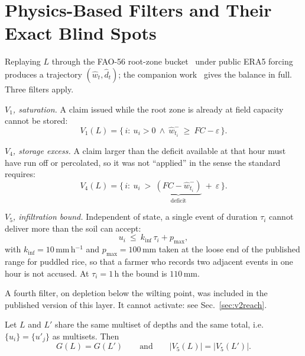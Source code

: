 \section{Physics-Based Filters and Their Exact Blind Spots}
\label{sec:filters}

Replaying $L$ through the FAO-56 root-zone bucket~\cite{fao56} under public ERA5
forcing produces a trajectory $(\hat w_t,\hat d_t)$; the companion
work~\cite{twingate2026} gives the balance in full. Three filters apply.

\emph{$V_1$, saturation.} A claim issued while the root zone is already at field
capacity cannot be stored:
\begin{equation}
V_1(L)=\{\,i:\ u_i>0\ \wedge\ \hat w_{t_i}^{-}\ \ge\ FC-\varepsilon\,\}.
\label{eq:v1}
\end{equation}

\emph{$V_4$, storage excess.} A claim larger than the deficit available at that
hour must have run off or percolated, so it was not ``applied'' in the sense the
standard requires:
\begin{equation}
V_4(L)=\{\,i:\ u_i\ >\ \underbrace{(FC-\hat w_{t_i}^{-})}_{\text{deficit}}
\ +\ \varepsilon\,\}.
\label{eq:v4}
\end{equation}

\emph{$V_5$, infiltration bound.} Independent of state, a single event of
duration $\tau_i$ cannot deliver more than the soil can accept:
\begin{equation}
u_i\ \le\ k_{\mathrm{inf}}\,\tau_i+p_{\max},
\label{eq:v5}
\end{equation}
with $k_{\mathrm{inf}}=10$\,mm\,h$^{-1}$ and $p_{\max}=100$\,mm taken at the
loose end of the published range for puddled rice, so that a farmer who records
two adjacent events in one hour is not accused. At $\tau_i=1$\,h the bound is
$110$\,mm.

A fourth filter, on depletion below the wilting point, was included in the
published version of this layer. It cannot activate: see
Sec.~\ref{sec:v2reach}.

\begin{proposition}
\label{prop:blind}
Let $L$ and $L'$ share the same multiset of depths and the same total, i.e.\
$\{u_i\}=\{u'_j\}$ as multisets. Then
\begin{equation}
G(L)=G(L')\qquad\text{and}\qquad |V_5(L)|=|V_5(L')|.
\end{equation}
\end{proposition}

